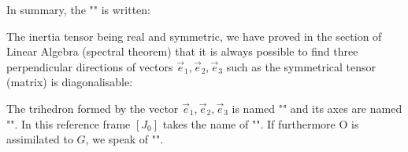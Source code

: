    In summary, the "" is written:
   
   The inertia tensor being real and symmetric, we have proved in the section of Linear Algebra (spectral theorem) that it is always possible to find three perpendicular directions of vectors $\vec{e}_1,\vec{e}_2,\vec{e}_3$ such as the symmetrical  tensor (matrix) is diagonalisable:
   
   The trihedron formed by the vector $\vec{e}_1,\vec{e}_2,\vec{e}_3$ is named "" and its axes are named "". In this reference frame $[J_0]$ takes the name of "". If furthermore O is assimilated to $G$, we speak of "".
   
